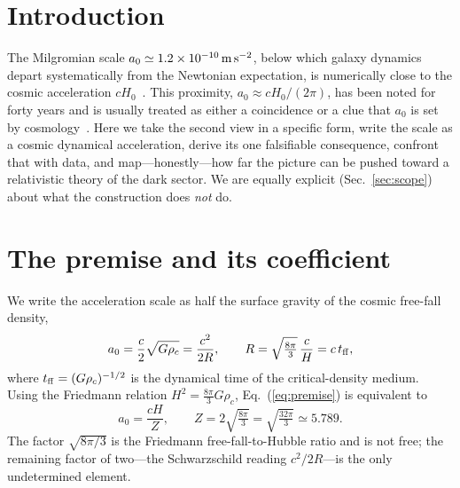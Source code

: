 \documentclass[aps,prd,preprint,nofootinbib,floatfix]{revtex4-2}
\begin{document}
\section{Introduction}
The Milgromian scale $a_0\simeq1.2\times10^{-10}\,{\rm m\,s^{-2}}$, below which
galaxy dynamics depart systematically from the Newtonian expectation, is
numerically close to the cosmic acceleration $cH_0$~\cite{Milgrom1983,Famaey2012}.
This proximity, $a_0\approx cH_0/(2\pi)$, has been noted for forty years and is
usually treated as either a coincidence or a clue that $a_0$ is set by
cosmology~\cite{Milgrom2011}. Here we take the second view in a specific form,
write the scale as a cosmic dynamical acceleration, derive its one falsifiable
consequence, confront that with data, and map---honestly---how far the picture
can be pushed toward a relativistic theory of the dark sector. We are equally
explicit (Sec.~\ref{sec:scope}) about what the construction does {\it not} do.

\section{The premise and its coefficient}
\label{sec:premise}
We write the acceleration scale as half the surface gravity of the cosmic
free-fall density,
\begin{equation}
a_0=\frac{c}{2}\sqrt{G\rho_c}=\frac{c^2}{2R},\qquad
R=\sqrt{\tfrac{8\pi}{3}}\,\frac{c}{H}=c\,t_{\rm ff},
\label{eq:premise}
\end{equation}
where $t_{\rm ff}=(G\rho_c)^{-1/2}$ is the dynamical time of the critical-density
medium. Using the Friedmann relation $H^2=\tfrac{8\pi}{3}G\rho_c$,
Eq.~(\ref{eq:premise}) is equivalent to
\begin{equation}
a_0=\frac{cH}{Z},\qquad
Z=2\sqrt{\tfrac{8\pi}{3}}=\sqrt{\tfrac{32\pi}{3}}\simeq5.789 .
\label{eq:Z}
\end{equation}
The factor $\sqrt{8\pi/3}$ is the Friedmann free-fall-to-Hubble ratio and is not
free; the remaining factor of two---the Schwarzschild reading $c^2/2R$---is the
only undetermined element.
\end{document}
